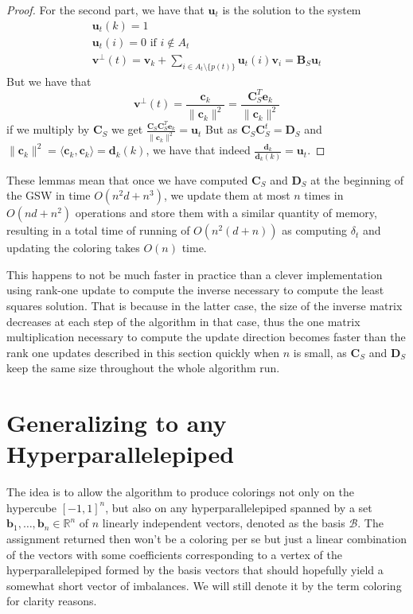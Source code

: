 \documentclass[12pt]{article}
\begin{document}
\begin{proof}
For the second part, we have that $\textbf{u}_t$ is the solution to the system \begin{align*}\textbf{u}_t(k) =1\\
            \textbf{u}_t(i) =0 \text{ if } i \notin A_t\\
            \textbf{v}^\perp(t) = \textbf{v}_{k} + \sum_{i \in A_t\setminus\{p(t)\}} \textbf{u}_t(i)\textbf{v}_i=\textbf{B}_S\textbf{u}_t\end{align*}
But we have that $$\textbf{v}^\perp(t)=\frac{\textbf{c}_k}{\|\textbf{c}_k\|^2}=\frac{\textbf{C}_S^T\textbf{e}_k}{\|\textbf{c}_k\|^2}$$
if we multiply by $\textbf{C}_S$ we get $\frac{\textbf{C}_S\textbf{C}_S^T\textbf{e}_k}{\|\textbf{c}_k\|^2}=\textbf{u}_t$ But as $\textbf{C}_S\textbf{C}_S^t=\textbf{D}_S$ and $\|\textbf{c}_k\|^2=\langle \textbf{c}_k,\textbf{c}_k\rangle=\textbf{d}_k(k)$, we have that indeed $\frac{\textbf{d}_k}{\textbf{d}_k(k)}=\textbf{u}_t$.
\end{proof}
These lemmas mean that once we have computed $\textbf{C}_S$ and $\textbf{D}_S$ at the beginning of the GSW in time $O(n^2d+n^3)$, we update them at most $n$ times in $O(nd+n^2)$ operations and store them with a similar quantity of memory, resulting in a total time of running of $O(n^2(d+n))$ as computing $\delta_t$ and updating the coloring takes $O(n)$ time.

This happens to not be much faster in practice than a clever implementation using rank-one update to compute the inverse necessary to compute the least squares solution. That is because in the latter case, the size of the inverse matrix decreases at each step of the algorithm in that case, thus the one matrix multiplication necessary to compute the update direction becomes faster than the rank one updates described in this section quickly when $n$ is small, as $\textbf{C}_S$ and $\textbf{D}_S$ keep the same size throughout the whole algorithm run.


\section{Generalizing to any Hyperparallelepiped}\label{different_basis_section}
The idea is to allow the algorithm to produce colorings not only on the hypercube $[-1,1]^n$, but also on any hyperparallelepiped spanned by a set $\textbf{b}_1,\dots, \textbf{b}_n\in\mathbb{R}^n$ of $n$ linearly independent vectors, denoted as the basis $\mathcal{B}$. The assignment returned then won't be a coloring per se but just a linear combination of the vectors with some coefficients corresponding to a vertex of the hyperparallelepiped formed by the basis vectors that should hopefully yield a somewhat short vector of imbalances. We will still denote it by the term coloring for clarity reasons.
\end{document}
